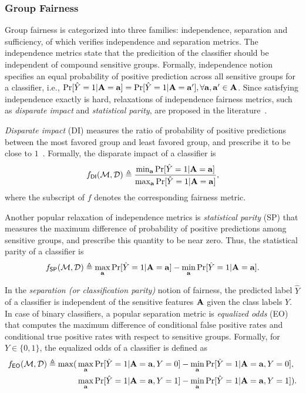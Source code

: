 \subsubsection{Group Fairness} Group fairness is categorized into three families: independence, separation and sufficiency, of which {\justicia} verifies independence and separation metrics. 
The independence metrics state that the predicition of the classifier should be independent of compound sensitive groups. Formally, independence notion specifies an equal probability of positive prediction across all sensitive groups for a classifier, i.e., $\Pr[\hat{Y} =1 | \mathbf{A} =  \mathbf{a}]  =  \Pr[\hat{Y} =1 | \mathbf{A} =  \mathbf{a}'] , \forall \mathbf{a}, \mathbf{a}' \in \mathbf{A}$.
Since satisfying independence exactly is hard, relaxations of independence fairness metrics, such as \textit{disparate impact} and \textit{statistical parity}, are proposed in the literature~\cite{dwork2012fairness,feldman2015certifying}.

\textit{Disparate impact} (DI) measures the ratio of probability of positive predictions between the most favored group and least favored group, and prescribe it to be close to $1$~\cite{feldman2015certifying}.  Formally, the disparate impact of a classifier is 
\[
f_{\mathsf{DI}}(\mathcal{M}, \mathcal{D}) \triangleq \frac{\min_{\mathbf{a}} \Pr[\hat{Y} =1 | \mathbf{A} =  \mathbf{a}]}{\max_{\mathbf{a}} \Pr[\hat{Y} =1 | \mathbf{A} =  \mathbf{a}]},
\]
where the subscript of $ f $ denotes the corresponding fairness metric.

Another popular relaxation of independence metrics  is \textit{statistical parity} (SP) that measures the maximum difference of probability of positive predictions among sensitive groups, and prescribe this quantity to be near zero. Thus, the statistical parity of  a classifier is 
\[ f_{\mathsf{SP}}(\mathcal{M}, \mathcal{D}) \triangleq \max_{\mathbf{a}}\Pr[\hat{Y} =1 | \mathbf{A} = \mathbf{a}] - \min_{\mathbf{a}}\Pr[\hat{Y} =1 | \mathbf{A} = \mathbf{a}]. \]



In the \textit{separation (or classification parity)} notion of fairness, the predicted label $\hat{Y}$ of a classifier is independent of the sensitive features $\mathbf{A}$ given the class labels $Y$. In case of binary classifiers, a popular separation metric is \textit{equalized odds} (EO)~\cite{hardt2016equality} that computes the maximum difference of conditional false positive rates  and conditional true positive rates  with respect to sensitive groups. Formally,  for $ Y \in \{0,1\} $,  the equalized odds of a classifier is defined as 
\begin{align*}
f_{\mathsf{EO}}(\mathcal{M}, \mathcal{D})  \triangleq \max(&\max_{\mathbf{a}}\Pr[\hat{Y} =1 | \mathbf{A} = \mathbf{a}, Y = 0] - \min_{\mathbf{a}}\Pr[\hat{Y} =1 | \mathbf{A} = \mathbf{a}, Y = 0], \\
&\max_{\mathbf{a}}\Pr[\hat{Y} =1 | \mathbf{A} = \mathbf{a}, Y = 1] - \min_{\mathbf{a}}\Pr[\hat{Y} =1 | \mathbf{A} = \mathbf{a}, Y = 1]). 
\end{align*}


